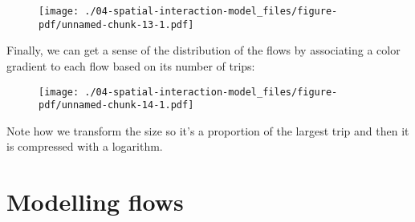 \documentclass[
  letterpaper,
  krantz2]{style/krantz}
\newenvironment{Shaded}{\begin{snugshade}}{\end{snugshade}}
\newcommand{\AttributeTok}[1]{\textcolor[rgb]{0.40,0.45,0.13}{#1}}
\newcommand{\FloatTok}[1]{\textcolor[rgb]{0.68,0.00,0.00}{#1}}
\newcommand{\FunctionTok}[1]{\textcolor[rgb]{0.28,0.35,0.67}{#1}}
\newcommand{\NormalTok}[1]{\textcolor[rgb]{0.00,0.23,0.31}{#1}}
\newcommand{\SpecialCharTok}[1]{\textcolor[rgb]{0.37,0.37,0.37}{#1}}
\newcommand{\StringTok}[1]{\textcolor[rgb]{0.13,0.47,0.30}{#1}}
\begin{document}
\begin{figure}[H]

{\centering \texttt{[image: ./04-spatial-interaction-model\_files/figure-pdf/unnamed-chunk-13-1.pdf]}

}

\end{figure}

Finally, we can get a sense of the distribution of the flows by
associating a color gradient to each flow based on its number of trips:

\begin{Shaded}
\end{Shaded}

\begin{figure}[H]

{\centering \texttt{[image: ./04-spatial-interaction-model\_files/figure-pdf/unnamed-chunk-14-1.pdf]}

}

\end{figure}

Note how we transform the size so it's a proportion of the largest trip
and then it is compressed with a logarithm.

\hypertarget{modelling-flows}{%
\section{Modelling flows}\label{modelling-flows}}
\end{document}
